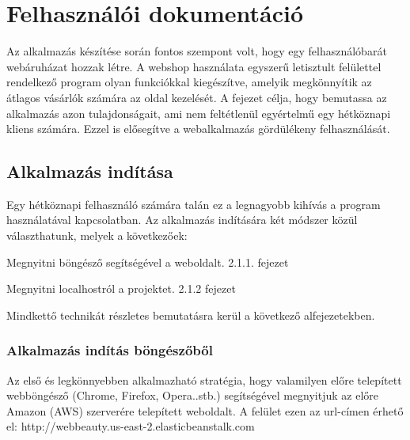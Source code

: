\chapter{Felhasználói dokumentáció} %
\label{ch:user}

Az alkalmazás készítése során fontos szempont volt, hogy egy felhasználóbarát webáruházat hozzak létre. A webshop használata egyszerű letisztult felülettel rendelkező program olyan funkciókkal kiegészítve, amelyik megkönnyítik az átlagos vásárlók számára az oldal kezelését. A fejezet célja, hogy bemutassa az alkalmazás azon tulajdonságait, ami nem feltétlenül egyértelmű egy hétköznapi kliens számára. Ezzel is elősegítve a webalkalmazás gördülékeny felhasználását.


\section{Alkalmazás indítása} %

Egy hétköznapi felhasználó számára talán ez a legnagyobb kihívás a program használatával kapcsolatban. Az alkalmazás indítására két módszer közül választhatunk, melyek a következőek:

\begin{compactenum}
	\item Megnyitni böngésző segítségével a weboldalt. 2.1.1. fejezet
	\item Megnyitni localhostról a projektet. 2.1.2 fejezet
\end{compactenum}

\bigskip
Mindkettő technikát részletes bemutatásra kerül a következő alfejezetekben.

\subsection{Alkalmazás indítás böngészőből}
Az első és legkönnyebben alkalmazható stratégia, hogy valamilyen előre telepített webböngésző (Chrome, Firefox, Opera..stb.) segítségével megnyitjuk az előre Amazon (AWS) szerverére telepített weboldalt. A felület ezen az url-címen érhető el: http://webbeauty.us-east-2.elasticbeanstalk.com

